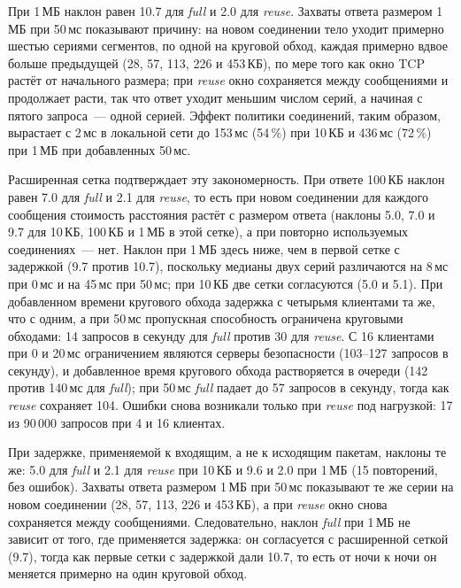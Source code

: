 \documentclass[conference,a4paper]{IEEEtran}
\begin{document}
При 1\,МБ наклон равен 10.7 для \emph{full} и 2.0 для \emph{reuse}.
Захваты ответа размером 1\,МБ при 50\,мс показывают причину: на новом соединении тело уходит примерно
шестью сериями сегментов, по одной на круговой обход, каждая примерно вдвое больше предыдущей (28, 57, 113, 226 и
453\,КБ), по мере того как окно TCP растёт от начального размера; при \emph{reuse} окно сохраняется между
сообщениями и продолжает расти, так что ответ уходит меньшим числом серий, а начиная с пятого запроса~---
одной серией. Эффект
политики соединений, таким образом, вырастает с 2\,мс в локальной сети до 153\,мс (54\,\%) при 10\,КБ и
436\,мс (72\,\%) при 1\,МБ при добавленных 50\,мс.

Расширенная сетка подтверждает эту закономерность. При ответе 100\,КБ наклон равен 7.0 для \emph{full} и
2.1 для \emph{reuse}, то есть при новом соединении для каждого сообщения стоимость расстояния растёт с
размером ответа (наклоны 5.0, 7.0 и 9.7 для 10\,КБ, 100\,КБ и 1\,МБ в этой сетке), а
при повторно используемых соединениях~--- нет. Наклон при 1\,МБ здесь ниже, чем в первой сетке с задержкой
(9.7 против 10.7), поскольку медианы двух серий различаются на 8\,мс при 0\,мс и на 45\,мс при
50\,мс; при 10\,КБ две сетки согласуются (5.0 и 5.1). При добавленном времени кругового обхода
задержка с четырьмя клиентами та же, что с одним, а при 50\,мс пропускная способность ограничена круговыми обходами: 14 запросов в секунду для
\emph{full} против 30 для \emph{reuse}. С 16 клиентами при 0 и 20\,мс ограничением являются серверы
безопасности (103--127 запросов в секунду), и добавленное время кругового обхода растворяется в очереди (142
против 140\,мс для \emph{full}); при 50\,мс \emph{full} падает до 57 запросов в секунду, тогда как
\emph{reuse} сохраняет 104. Ошибки снова возникали только при \emph{reuse} под нагрузкой: 17 из 90\,000
запросов при 4 и 16 клиентах.

При задержке, применяемой к входящим, а не к исходящим пакетам, наклоны те же: 5.0 для
\emph{full} и 2.1 для \emph{reuse} при 10\,КБ и 9.6 и 2.0 при 1\,МБ (15 повторений, без
ошибок). Захваты ответа размером 1\,МБ при 50\,мс показывают те же серии на новом соединении (28, 57,
113, 226 и 453\,КБ), а при \emph{reuse} окно снова сохраняется между сообщениями. Следовательно, наклон
\emph{full} при 1\,МБ не зависит от того, где применяется задержка: он согласуется с
расширенной сеткой (9.7), тогда как первые сетки с задержкой дали 10.7, то есть от ночи к ночи он меняется примерно на один
круговой обход.
\end{document}
